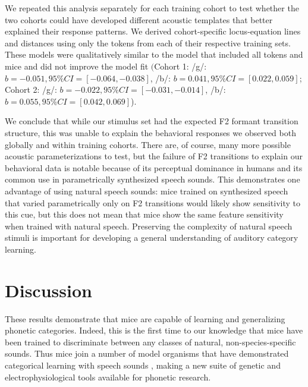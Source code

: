 We repeated this analysis separately for each training cohort to test whether the two cohorts could have developed different acoustic templates that better explained their response patterns. We derived cohort-specific locus-equation lines and distances using only the tokens from each of their respective training sets. These models were qualitatively similar to the model that included all tokens and mice and did not improve the model fit $($Cohort 1: /g/: $b=-0.051, 95\% CI = [-0.064, -0.038]$, /b/: $b=0.041, 95\% CI = [0.022, 0.059]$; Cohort 2: /g/: $b=-0.022, 95\% CI = [-0.031, -0.014]$, /b/: $b=0.055, 95\% CI = [0.042, 0.069]$).

We conclude that while our stimulus set had the expected F2 formant transition structure, this was unable to explain the behavioral responses we observed both globally and within training cohorts. There are, of course, many more possible acoustic parameterizations to test, but the failure of F2 transitions to explain our behavioral data is notable because of its perceptual dominance in humans and its common use in parametrically synthesized speech sounds. This demonstrates one advantage of using natural speech sounds: mice trained on synthesized speech that varied parametrically only on F2 transitions would likely show sensitivity to this cue, but this does not mean that mice show the same feature sensitivity when trained with natural speech. Preserving the complexity of natural speech stimuli is important for developing a general understanding of auditory category learning.

%
%

\section{\Large Discussion}

These results demonstrate that mice are capable of learning and generalizing phonetic categories. Indeed, this is the first time to our knowledge that mice have been trained to discriminate between any classes of natural, non-species-specific sounds. Thus mice join a number of model organisms that have demonstrated categorical learning with speech sounds \citep{Kluender1987,Lotto1997,Kluender2000,Kuhl1978,Engineer2015,Kuhl1983,Dooling1995}, making a new suite of genetic and electrophysiological tools available for phonetic research.

